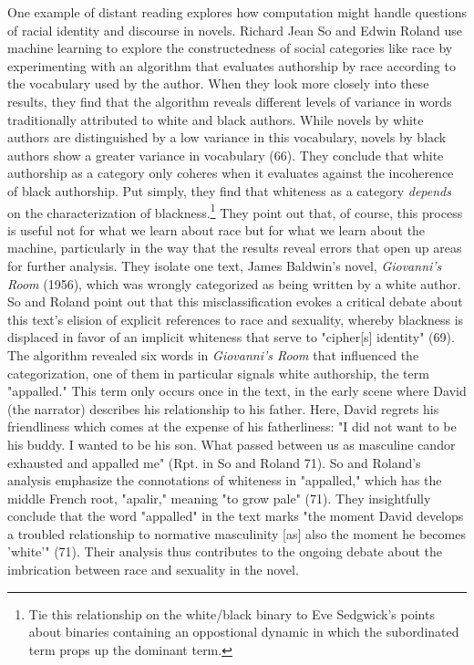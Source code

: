 \documentclass[11pt]{article}
\begin{document}
One example of distant reading explores how computation might handle
questions of racial identity and discourse in novels. Richard Jean So
and Edwin Roland use machine learning to explore the constructedness
of social categories like race by experimenting with an algorithm that
evaluates authorship by race according to the vocabulary used by the
author.  When they look more closely into these results, they find
that the algorithm reveals different levels of variance in words
traditionally attributed to white and black authors. While novels by
white authors are distinguished by a low variance in this vocabulary,
novels by black authors show a greater variance in vocabulary
(66). They conclude that white authorship as a category only coheres
when it evaluates against the incoherence of black authorship. Put
simply, they find that whiteness as a category \emph{depends} on the
characterization of blackness.\footnote{Tie this relationship on the white/black binary to Eve
Sedgwick's points about binaries containing an oppostional dynamic in
which the subordinated term props up the dominant term.} They point out that, of course,
this process is useful not for what we learn about race but for what
we learn about the machine, particularly in the way that the results
reveal errors that open up areas for further analysis. They isolate
one text, James Baldwin's novel, \emph{Giovanni's Room} (1956), which was
wrongly categorized as being written by a white author. So and Roland
point out that this misclassification evokes a critical debate about
this text's elision of explicit references to race and sexuality,
whereby blackness is displaced in favor of an implicit whiteness that
serve to "cipher[s] identity" (69). The algorithm revealed six words
in \emph{Giovanni's Room} that influenced the categorization, one of them
in particular signals white authorship, the term "appalled." This term
only occurs once in the text, in the early scene where David (the
narrator) describes his relationship to his father. Here, David
regrets his friendliness which comes at the expense of his
fatherliness: "I did not want to be his buddy. I wanted to be his
son. What passed between us as masculine candor exhausted and appalled
me" (Rpt. in So and Roland 71). So and Roland's analysis emphasize the
connotations of whiteness in "appalled," which has the middle French
root, "apalir," meaning "to grow pale" (71). They insightfully
conclude that the word "appalled" in the text marks "the moment David
develops a troubled relationship to normative masculinity [as] also
the moment he becomes 'white'" (71). Their analysis thus contributes
to the ongoing debate about the imbrication between race and sexuality
in the novel.
\end{document}
